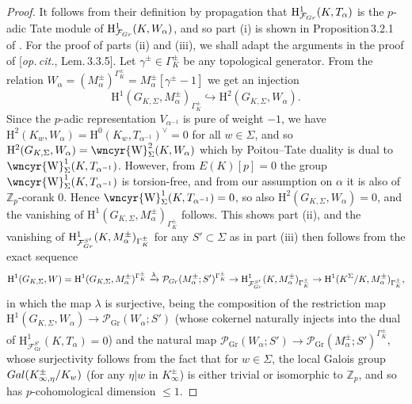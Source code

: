 \documentclass[a4paper,10pt]{amsart}
\numberwithin{equation}{section}
\numberwithin{equation}{section}
\theoremstyle{plain}
\theoremstyle{definition}
\theoremstyle{definition}
\theoremstyle{plain}
\theoremstyle{plain}
\theoremstyle{plain}
\theoremstyle{plain}
\newcommand{\Z}{\mathbb{Z}}
\newcommand{\sha}{\text{\wncyr{W}}}
\DeclareMathOperator{\Gr}{Gr}
\newcommand{\Fcal}{\mathcal{F}}
\newcommand{\rH}{\mathrm{H}}
\begin{document}
\begin{proof}
It follows from their definition by propagation that $\rH^1_{\Fcal_{\rm Gr}}(K,T_\alpha)$ is the $p$-adic Tate module of $\rH^1_{\Fcal_{\rm Gr}}(K,W_\alpha)$, and so part (i) is shown in Proposition\,3.2.1 of \cite{jsw}. For the proof of parts (ii) and (iii),  we shall adapt the arguments in the proof of [\emph{op.\,cit.}, Lem.\,3.3.5]. 
Let $\gamma^\pm\in\Gamma_K^{\pm}$ be any topological generator. From the relation $W_\alpha=%
(M_\alpha^\pm)^{\Gamma_K^\pm}=M_\alpha^\pm[\gamma^\pm-1]$ we get an injection 
\begin{equation}\label{eq:inj-h2}
\rH^1(G_{K,\Sigma},M_\alpha^\pm)_{\Gamma_K^\pm}\hookrightarrow\rH^2(G_{K,\Sigma},W_\alpha).\nonumber
\end{equation}
Since the $p$-adic representation $V_{\alpha^{-1}}$ is pure of weight $-1$, we have $\rH^2(K_w,W_\alpha)=\rH^0(K_w,T_{\alpha^{-1}})^\vee=0$ for all $w\in\Sigma$, and so $\rH^2(G_{K,\Sigma},W_\alpha)=\sha_\Sigma^2(K,W_\alpha)$ %
which by Poitou--Tate duality is dual to $\sha_\Sigma^1(K,T_{\alpha^{-1}})$. %
However, from $E(K)[p]=0$ the group $\sha_\Sigma^1(K,T_{\alpha^{-1}})$ is torsion-free, and from our assumption on $\alpha$ it is also of $\Z_p$-corank $0$. Hence $\sha_\Sigma^1(K,T_{\alpha^{-1}})=0$, so also $\rH^2(G_{K,\Sigma},W_\alpha)=0$, and the vanishing of $\rH^1(G_{K,\Sigma},M_\alpha^\pm)_{\Gamma_K^\pm}$ follows. This shows part (ii), and the vanishing of $\rH^1_{\Fcal_{\rm Gr}^{S'}}(K,M_\alpha^\pm)_{\Gamma_K^\pm}$ for any $S'\subset\Sigma$ as in part (iii) then follows from the exact sequence
\[
\rH^1(G_{K,\Sigma},W)=\rH^1(G_{K,\Sigma},M_\alpha^\pm)^{\Gamma_K^\pm}\xrightarrow{\lambda}\mathcal{P}_{\rm Gr}(M_\alpha^{\pm};S')^{\Gamma_K^\pm}\rightarrow\rH^1_{\Fcal_{\rm Gr}^{S'}}(K,M_\alpha^\pm)_{\Gamma_K^\pm}\rightarrow \rH^1(K^\Sigma/K,M_\alpha^\pm)_{\Gamma_K^\pm},
\]
in which the map $\lambda$ is surjective, being the composition of the restriction map $\rH^1(G_{K,\Sigma},W_\alpha)\rightarrow\mathcal{P}_{\Gr}(W_\alpha;S')$ (whose cokernel naturally injects into the dual of $\rH^1_{\Fcal_{\Gr}^{S'}}(K,T_{\alpha})=0$) and the natural map $\mathcal{P}_{\Gr}(W_\alpha;S')\rightarrow\mathcal{P}_{\Gr}(M_\alpha^{\pm};S')^{\Gamma_K^\pm}$, whose surjectivity follows from the fact that for $w\in\Sigma$, the local Galois group ${\rm Gal}(K_{\infty,\eta}^\pm/K_w)$ (for any $\eta\vert w$ in $K_\infty^\pm$) is either trivial or isomorphic to $\Z_p$, and so has $p$-cohomological dimension $\leq 1$.
\end{proof}
\end{document}
